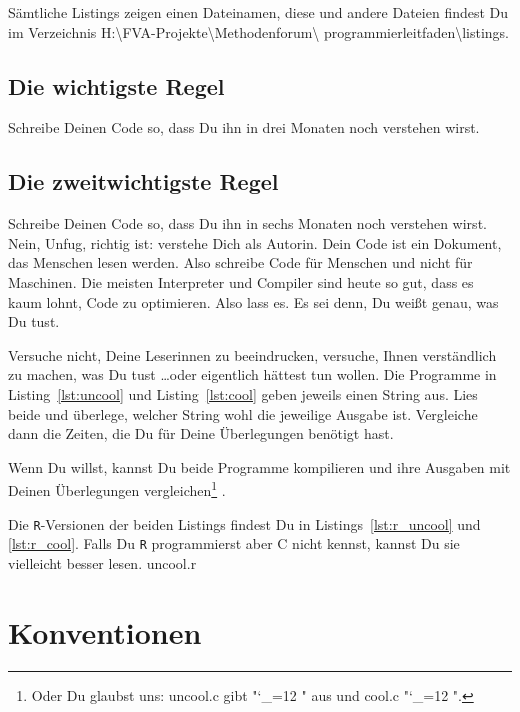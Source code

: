 \documentclass[twoside]{scrreprt}
\providecommand{\R}{\texttt{R}}
\providecommand{\proot}{%
H:\textbackslash{}FVA-Projekte\textbackslash{}Methodenforum\textbackslash{}%
}
\providecommand{\pdir}{\proot{}programmierleitfaden\textbackslash{}}
\begin{document}
S\"a{}mtliche Listings zeigen einen Dateinamen, diese und andere  Dateien
findest Du im Verzeichnis 
\pdir{}listings.

\section{Die wichtigste Regel\label{sec:R1}}
Schreibe Deinen Code so, dass Du ihn in drei Monaten noch verstehen wirst.

\section{Die zweitwichtigste Regel\label{sec:R2}}
Schreibe Deinen Code so, dass Du ihn in sechs Monaten noch verstehen wirst.
Nein, Unfug, richtig ist: verstehe Dich als Autorin. Dein Code ist ein Dokument,
das Menschen lesen werden. Also schreibe Code f\"u{}r Menschen und nicht f\"u{}r
Maschinen. Die meisten Interpreter und Compiler sind heute so gut, dass es
kaum lohnt, Code zu optimieren. Also lass es. Es sei denn, Du wei\ss{}t
genau, was Du tust.

Versuche nicht, Deine Leserinnen zu beeindrucken, versuche, Ihnen
verst\"a{}ndlich zu machen, was Du tust \ldots oder eigentlich h\"a{}ttest tun
wollen.
Die Programme in  Listing~\ref{lst:uncool} und Listing~\ref{lst:cool} geben
jeweils einen String aus. Lies beide und
\"u{}berlege, welcher String wohl die jeweilige Ausgabe ist. Vergleiche dann die
Zeiten, die Du f\"u{}r Deine \"U{}berlegungen ben\"o{}tigt
hast.



Wenn Du willst, kannst Du  beide Programme kompilieren und ihre Ausgaben mit
Deinen \"U{}berlegungen vergleichen\footnote{%
%
Oder Du glaubst uns: uncool.c gibt
"\catcode`_=12 \ttfamily "
aus und cool.c
"\catcode`_=12 \ttfamily ".
}%
.

Die \R{}-Versionen der beiden Listings findest Du in 
Listings~\ref{lst:r_uncool} und \ref{lst:r_cool}. Falls Du \R{} programmierst
aber C nicht kennst, kannst Du sie vielleicht besser lesen.
%
{uncool.r}



\chapter{Konventionen\label{sec:conventions}}
\end{document}
